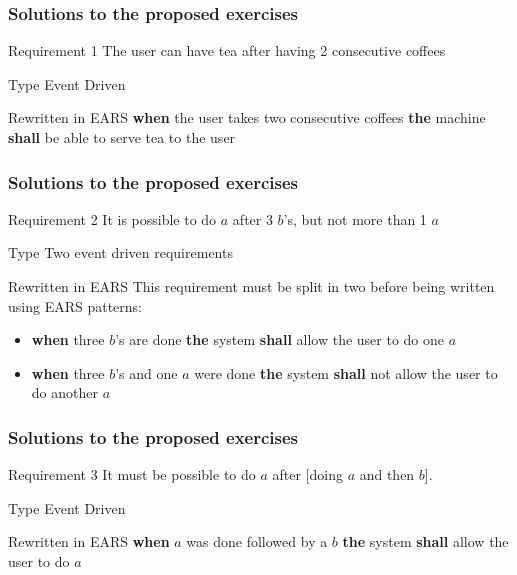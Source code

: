 \documentclass[aspectratio=169]{beamer}
\newcommand{\earse}[3]{{\bf \color{mygreen}when} {#1} {\bf \color{mypurple}the} {#2} {\bf \color{mypurple}shall} {#3}}
\begin{document}
\begin{frame}
  \frametitle{Solutions to the proposed exercises}
  \begin{block}{Requirement 1}
    The user can have \alert{tea} after having 2 consecutive \alert{coffees}
  \end{block}
  \begin{block}{Type}
  Event Driven 
  \end{block}
  \begin{block}{Rewritten in EARS}
   \earse{the user takes two consecutive coffees}{machine}{be able to serve tea to the user}
  \end{block}
\end{frame}

\begin{frame}
  \frametitle{Solutions to the proposed exercises}
  \begin{block}{Requirement 2}
    It is possible to do \alert{$a$} after 3 \alert{$b$}'s, but not more than 1 \alert{$a$}
  \end{block}
  \begin{block}{Type}
  Two event driven requirements  
  \end{block}
  \begin{block}{Rewritten in EARS}
   This requirement must be split in two before being written using EARS patterns:
   \begin{itemize}
   \item \earse{three \alert{$b$}'s are done}{system}{allow the user to do one \alert{$a$}}
   \item \earse{three \alert{$b$}'s and one \alert{$a$} were done}{system}{not allow the user to do another \alert{$a$}}
   \end{itemize}
  \end{block}
\end{frame}

\begin{frame}
  \frametitle{Solutions to the proposed exercises}
  \begin{block}{Requirement 3}
    It must be possible to do \alert{$a$} after [doing \alert{$a$} and then \alert{$b$}].
  \end{block}
  \begin{block}{Type}
   Event Driven
  \end{block}
  \begin{block}{Rewritten in EARS}
   \earse{\alert{$a$} was done followed by a \alert{$b$}}{system}{allow the user to do \alert{$a$}}
  \end{block}
\end{frame}
\end{document}
